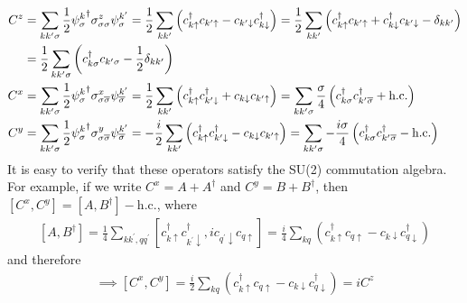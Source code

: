 \documentclass[12pt,twoside]{report}
\numberwithin{equation}{section}
\begin{document}
\begin{equation}\begin{aligned}
	C^z 
	&= \sum_{kk^\prime\sigma}\frac{1}{2} {\psi^k_\sigma}^\dagger \sigma^z_{\sigma\sigma} \psi^{k^\prime}_\sigma = \frac{1}{2}\sum_{kk^\prime}\left({c^\dagger_{k\uparrow}c_{k^\prime \uparrow} - c_{k^\prime\downarrow}c^\dagger_{k \downarrow}}\right) = \frac{1}{2}\sum_{kk^\prime}\left(c^\dagger_{k\uparrow}c_{k^\prime \uparrow} + c^\dagger_{k\downarrow}c_{k^\prime \downarrow} - \delta_{kk^\prime}\right)\\
	&= \frac{1}{2}\sum_{kk^\prime\sigma}\left(c^\dagger_{k\sigma}c_{k^\prime \sigma} - \frac{1}{2}\delta_{kk^\prime}\right)\label{diagonalCz}\\
	C^x 
	&= \sum_{kk^\prime\sigma}\frac{1}{2} {\psi^k_\sigma}^\dagger \sigma^x_{\sigma\overline\sigma} \psi^{k^\prime}_{\overline\sigma} = \frac{1}{2}\sum_{kk^\prime}\left( c^\dagger_{k\uparrow}c^\dagger_{k^\prime \downarrow} + c_{k\downarrow}c_{k^\prime \uparrow} \right) = \sum_{kk^\prime\sigma} \frac{\sigma}{4}\left( c^\dagger_{k\sigma}c^\dagger_{k^\prime\overline\sigma} + \text{h.c.} \right) \\
	C^y 
	&= \sum_{kk^\prime\sigma}\frac{1}{2} {\psi^k_\sigma}^\dagger \sigma^y_{\sigma\overline\sigma} \psi^{k^\prime}_{\overline\sigma} = - \frac{i}{2}\sum_{kk^\prime}\left( c^\dagger_{k\uparrow}c^\dagger_{k^\prime \downarrow} - c_{k\downarrow}c_{k^\prime \uparrow} \right) = \sum_{kk^\prime\sigma} - \frac{i\sigma}{4}\left( c^\dagger_{k\sigma}c^\dagger_{k^\prime\overline\sigma} - \text{h.c.} \right)\\
\end{aligned}\end{equation}
It is easy to verify that these operators satisfy the SU(2) commutation algebra. For example, if we write \(C^x = A + A^\dagger\) and \(C^y = B + B^\dagger\), then \(\left[ C^x, C^y \right] = \left[ A, B^\dagger \right] - \text{h.c.}\), where
\begin{equation}\begin{aligned}
	\left[ A, B^\dagger \right] = \frac{1}{4}\sum_{kk^\prime,qq^\prime}\left[ c^\dagger_{k\uparrow}c^\dagger_{k^\prime \downarrow}, i c_{q^\prime \downarrow}c_{q \uparrow} \right] = \frac{i}{4}\sum_{kq}\left(c^\dagger_{k\uparrow}c_{q \uparrow} - c_{k \downarrow}c^\dagger_{q \downarrow}\right)
\end{aligned}\end{equation}
and therefore
\begin{equation}\begin{aligned}
	\implies \left[ C^x, C^y \right] = \frac{i}{2}\sum_{kq}\left(c^\dagger_{k\uparrow}c_{q \uparrow} - c_{k \downarrow}c^\dagger_{q \downarrow}\right) = i C^z
\end{aligned}\end{equation}
\end{document}
